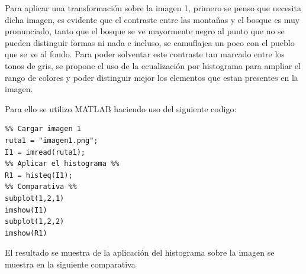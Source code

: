 \documentclass[11pt, letterpaper]{article}
\begin{document}
Para aplicar una transformación sobre la imagen 1, primero se penso que necesita dicha imagen, es evidente que el contraste entre las montañas y el bosque es muy pronunciado, tanto que el bosque se ve mayormente negro al punto que no se pueden distinguir formas ni nada e incluso, se camuflajea un poco con el pueblo que se ve al fondo. Para poder solventar este contraste tan marcado entre los tonos de gris, se propone el uso de la ecualización por histograma para ampliar el rango de colores y poder distinguir mejor los elementos que estan presentes en la imagen.

Para ello se utilizo MATLAB haciendo uso del siguiente codigo:

\begin{verbatim}
%% Cargar imagen 1  
ruta1 = "imagen1.png";
I1 = imread(ruta1);
%% Aplicar el histograma %%
R1 = histeq(I1); 
%% Comparativa %%
subplot(1,2,1)
imshow(I1)
subplot(1,2,2)
imshow(R1)
\end{verbatim}

El resultado se muestra de la aplicación del histograma sobre la imagen se muestra en la siguiente comparativa
\end{document}
